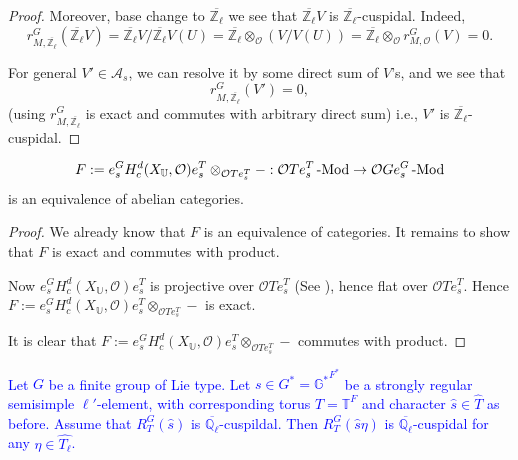 \begin{proof}
		Moreover, base change to $\overline{\mathbb{Z}_{\ell}}$ we see that $\overline{\mathbb{Z}_{\ell}}V$ is $\overline{\mathbb{Z}_{\ell}}$-cuspidal. Indeed, 
		$$r^G_{M, \overline{\mathbb{Z}_{\ell}}}(\overline{\mathbb{Z}_{\ell}}V)=\overline{\mathbb{Z}_{\ell}}V/\overline{\mathbb{Z}_{\ell}}V(U)=\overline{\mathbb{Z}_{\ell}}\otimes_{\mathcal{O}}(V/V(U))=\overline{\mathbb{Z}_{\ell}}\otimes_{\mathcal{O}}r^G_{M, \mathcal{O}}(V)=0.$$
		
		For general $V' \in \mathcal{A}_s$, we can resolve it by some direct sum of $V$'s, and we see that
		$$r^G_{M, \overline{\mathbb{Z}_{\ell}}}(V')=0,$$
		(using $r^G_{M, \overline{\mathbb{Z}_{\ell}}}$ is exact and commutes with arbitrary direct sum) i.e., $V'$ is $\overline{\mathbb{Z}_{\ell}}$-cuspidal.
	\end{proof}
	

	

	
	\begin{lemma}\label{Lem abelian}
		$$F:=e_s^GH^d_c(X_{\mathbb{U}}, \mathcal{O})e_s^T\otimes_{\mathcal{O}Te_s^T}-: \mathcal{O}Te_s^T\operatorname{-Mod} \to \mathcal{O}Ge_s^G\operatorname{-Mod}$$ is an equivalence of abelian categories.
	\end{lemma}
	
	\begin{proof}
		We already know that $F$ is an equivalence of categories. It remains to show that $F$ is exact and commutes with product.
		
		Now $e_s^GH^d_c(X_{\mathbb{U}}, \mathcal{O})e_s^T$ is projective over ${\mathcal{O}Te_s^T}$ (See \cite[Proof of Theorem 3.3]{broue1990isometries}), hence flat over ${\mathcal{O}Te_s^T}$. Hence $F:=e_s^GH^d_c(X_{\mathbb{U}}, \mathcal{O})e_s^T\otimes_{\mathcal{O}Te_s^T}-$ is exact.
		
		It is clear that $F:=e_s^GH^d_c(X_{\mathbb{U}}, \mathcal{O})e_s^T\otimes_{\mathcal{O}Te_s^T}-$ commutes with product.
	\end{proof}

    \textcolor{blue}{
    \begin{lemma}\label{Lem Q_l-bar cuspidal}
    	Let $G$ be a finite group of Lie type. Let $s \in G^*=\mathbb{G^*}^{F^*}$ be a strongly regular semisimple $\ell'$-element, with corresponding torus $T=\mathbb{T}^F$ and character $\hat{s} \in \hat{T}$ as before. Assume that $R_T^G(\hat{s})$ is $\overline{\mathbb{Q}_{\ell}}$-cuspildal. Then $R_T^G(\hat{s}\eta)$ is $\overline{\mathbb{Q}_{\ell}}$-cuspidal for any $\eta \in \hat{T_{\ell}}$.
    \end{lemma}
    }
	
